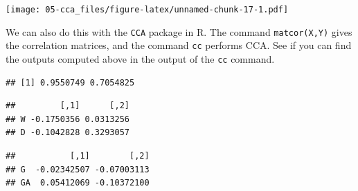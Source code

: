 \documentclass[]{book}
\newenvironment{Shaded}{\begin{snugshade}}{\end{snugshade}}
\newcommand{\CommentTok}[1]{\textcolor[rgb]{0.56,0.35,0.01}{\textit{#1}}}
\newcommand{\KeywordTok}[1]{\textcolor[rgb]{0.13,0.29,0.53}{\textbf{#1}}}
\newcommand{\NormalTok}[1]{#1}
\newcommand{\OperatorTok}[1]{\textcolor[rgb]{0.81,0.36,0.00}{\textbf{#1}}}
\newcommand{\StringTok}[1]{\textcolor[rgb]{0.31,0.60,0.02}{#1}}
\theoremstyle{definition}
\theoremstyle{definition}
\theoremstyle{definition}
\theoremstyle{remark}
\begin{document}
\texttt{[image: 05-cca\_files/figure-latex/unnamed-chunk-17-1.pdf]}

We can also do this with the \texttt{CCA} package in R. The command \texttt{matcor(X,Y)} gives the correlation matrices, and the command \texttt{cc} performs CCA. See if you can find the outputs computed above in the output of the \texttt{cc} command.

\begin{Shaded}
\end{Shaded}

\begin{verbatim}
## [1] 0.9550749 0.7054825
\end{verbatim}

\begin{Shaded}
\end{Shaded}

\begin{verbatim}
##         [,1]      [,2]
## W -0.1750356 0.0313256
## D -0.1042828 0.3293057
\end{verbatim}

\begin{Shaded}
\end{Shaded}

\begin{verbatim}
##           [,1]        [,2]
## G  -0.02342507 -0.07003113
## GA  0.05412069 -0.10372100
\end{verbatim}

\begin{Shaded}
\end{Shaded}
\end{document}
